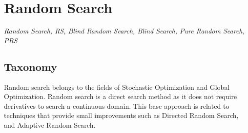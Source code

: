 

\section{Random Search} 
\label{sec:random_search}

\emph{Random Search, RS, Blind Random Search, Blind Search, Pure Random Search, PRS}

\subsection{Taxonomy}
Random search belongs to the fields of Stochastic Optimization and Global Optimization.
Random search is a direct search method as it does not require derivatives to search a continuous domain.
This base approach is related to techniques that provide small improvements such as Directed Random Search, and Adaptive Random Search. 

